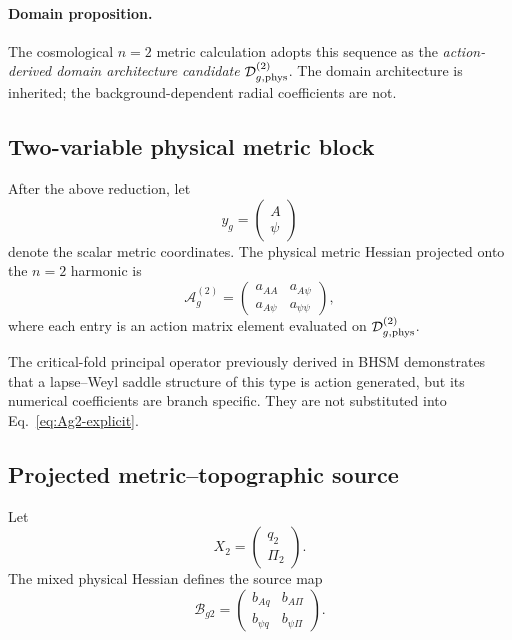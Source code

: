 \paragraph{Domain proposition.}
The cosmological $n=2$ metric calculation adopts this sequence as the
\emph{action-derived domain architecture candidate}
$\mathcal D_{g,\rm phys}^{(2)}$.  The domain architecture is inherited; the
background-dependent radial coefficients are not.

\subsection{Two-variable physical metric block}

After the above reduction, let
\begin{equation}
y_g
=
\begin{pmatrix}
A\\
\psi
\end{pmatrix}
\end{equation}
denote the scalar metric coordinates.  The physical metric Hessian projected
onto the $n=2$ harmonic is
\begin{equation}
\boxed{
\mathcal A_g^{(2)}
=
\begin{pmatrix}
a_{AA} & a_{A\psi}\\
a_{A\psi} & a_{\psi\psi}
\end{pmatrix},
}
\label{eq:Ag2-explicit}
\end{equation}
where each entry is an action matrix element evaluated on
$\mathcal D_{g,\rm phys}^{(2)}$.

The critical-fold principal operator previously derived in BHSM demonstrates
that a lapse--Weyl saddle structure of this type is action generated, but its
numerical coefficients are branch specific.  They are not substituted into
Eq.~\eqref{eq:Ag2-explicit}.

\subsection{Projected metric--topographic source}

Let
\begin{equation}
X_2
=
\begin{pmatrix}
q_2\\
\Pi_2
\end{pmatrix}.
\end{equation}
The mixed physical Hessian defines the source map
\begin{equation}
\boxed{
\mathcal B_{g2}
=
\begin{pmatrix}
b_{Aq} & b_{A\Pi}\\
b_{\psi q} & b_{\psi\Pi}
\end{pmatrix}.
}
\label{eq:Bg2-explicit}
\end{equation}

